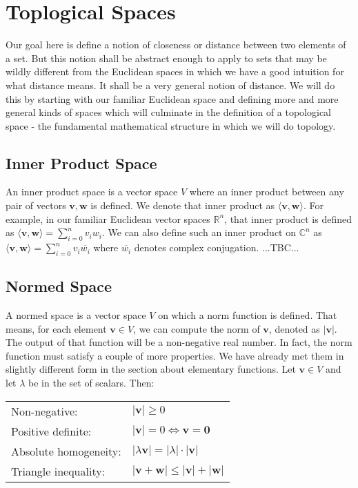 \section{Toplogical Spaces}
Our goal here is define a notion of closeness or distance between two elements of a set. But this notion shall be abstract enough to apply to sets that may be wildly different from the Euclidean spaces in which we have a good intuition for what distance means. It shall be a very general notion of distance. We will do this by starting with our familiar Euclidean space and defining more and more general kinds of spaces which will culminate in the definition of a topological space - the fundamental mathematical structure in which we will do topology.

\subsection{Inner Product Space}
An inner product space is a vector space $V$ where an inner product between any pair of vectors $\mathbf{v,w}$ is defined. We denote that inner product as $\langle \mathbf{v,w} \rangle$. For example, in our familiar Euclidean vector spaces $\mathbb{R}^n$, that inner product is defined as $\langle \mathbf{v,w} \rangle = \sum_{i=0}^n v_i w_i$. We can also define such an inner product on  $\mathbb{C}^n$ as $\langle \mathbf{v,w} \rangle = \sum_{i=0}^n v_i \overline{w_i}$ where $\overline{w_i}$ denotes complex conjugation. ...TBC...







\subsection{Normed Space}
A normed space is a vector space $V$ on which a norm function is defined. That means, for each element $\mathbf{v} \in V$, we can compute the norm of $\mathbf{v}$, denoted as $|\mathbf{v}|$. The output of that function will be a non-negative real number. In fact, the norm function must satisfy a couple of more properties. We have already met them in slightly different form in the section about elementary functions. Let $\mathbf{v} \in V$ and let $\lambda$ be in the set of scalars. Then:

\medskip
\begin{tabular}{l l}
Non-negative:         & $|\mathbf{v}| \geq 0$  \\
Positive definite:    & $|\mathbf{v}| = 0 \Leftrightarrow \mathbf{v} = \mathbf{0}$  \\
Absolute homogeneity: & $|\lambda \mathbf{v}| = |\lambda| \cdot |\mathbf{v}|$  \\
Triangle inequality:  & $|\mathbf{v} + \mathbf{w}| \leq |\mathbf{v}| + |\mathbf{w}|$
\end{tabular}
\medskip

